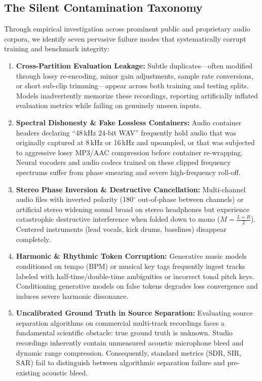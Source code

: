 \documentclass[10pt,journal,compsoc]{IEEEtran}
\begin{document}
\subsection{The Silent Contamination Taxonomy}
Through empirical investigation across prominent public and proprietary audio corpora, we identify seven pervasive failure modes that systematically corrupt training and benchmark integrity:

\begin{enumerate}
    \item \textbf{Cross-Partition Evaluation Leakage:} Subtle duplicates—often modified through lossy re-encoding, minor gain adjustments, sample rate conversions, or short sub-clip trimming—appear across both training and testing splits. Models inadvertently memorize these recordings, reporting artificially inflated evaluation metrics while failing on genuinely unseen inputs.
    \item \textbf{Spectral Dishonesty \& Fake Lossless Containers:} Audio container headers declaring ``48\,kHz 24-bit WAV'' frequently hold audio that was originally captured at 8\,kHz or 16\,kHz and upsampled, or that was subjected to aggressive lossy MP3/AAC compression before container re-wrapping. Neural vocoders and audio codecs trained on these clipped frequency spectrums suffer from phase smearing and severe high-frequency roll-off.
    \item \textbf{Stereo Phase Inversion \& Destructive Cancellation:} Multi-channel audio files with inverted polarity (180$^\circ$ out-of-phase between channels) or artificial stereo widening sound broad on stereo headphones but experience catastrophic destructive interference when folded down to mono ($M = \frac{L+R}{2}$). Centered instruments (lead vocals, kick drums, basslines) disappear completely.
    \item \textbf{Harmonic \& Rhythmic Token Corruption:} Generative music models conditioned on tempo (BPM) or musical key tags frequently ingest tracks labeled with half-time/double-time ambiguities or incorrect tonal pitch keys. Conditioning generative models on false tokens degrades loss convergence and induces severe harmonic dissonance.
    \item \textbf{Uncalibrated Ground Truth in Source Separation:} Evaluating source separation algorithms on commercial multi-track recordings faces a fundamental scientific obstacle: true ground truth is unknown. Studio recordings inherently contain unmeasured acoustic microphone bleed and dynamic range compression. Consequently, standard metrics (SDR, SIR, SAR) fail to distinguish between algorithmic separation failure and pre-existing acoustic bleed.

\end{enumerate}
\end{document}
